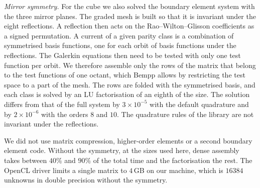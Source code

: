 \emph{Mirror symmetry.} For the cube we also solved the boundary element system with the three mirror planes. The graded mesh is built so that it is invariant under the eight reflections. A reflection then acts on the Rao--Wilton--Glisson coefficients as a signed permutation. A current of a given parity class is a combination of symmetrised basis functions, one for each orbit of basis functions under the reflections. The Galerkin equations then need to be tested with only one test function per orbit. We therefore assemble only the rows of the matrix that belong to the test functions of one octant, which Bempp allows by restricting the test space to a part of the mesh. The rows are folded with the symmetrised basis, and each class is solved by an LU factorisation of an eighth of the size. The solution differs from that of the full system by $3\times10^{-5}$ with the default quadrature and by $2\times10^{-6}$ with the orders $8$ and $10$. The quadrature rules of the library are not invariant under the reflections.

We did not use matrix compression, higher-order elements or a second boundary element code. Without the symmetry, at the sizes used here, dense assembly takes between $40\%$ and $90\%$ of the total time and the factorisation the rest. The OpenCL driver limits a single matrix to $4$\,GB on our machine, which is $16384$ unknowns in double precision without the symmetry.
